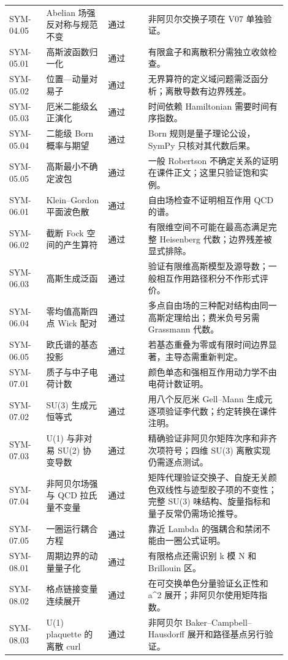 \begin{longtable}{p{0.12\linewidth}p{0.20\linewidth}p{0.13\linewidth}p{0.45\linewidth}}
SYM-04.05 & Abelian 场强反对称与规范不变 & 通过 & 非阿贝尔交换子项在 V07 单独验证。\\
SYM-05.01 & 高斯波函数归一化 & 通过 & 有限盒子和离散积分需独立收敛检查。\\
SYM-05.02 & 位置—动量对易子 & 通过 & 无界算符的定义域问题需泛函分析；离散导数有边界残差。\\
SYM-05.03 & 厄米二能级幺正演化 & 通过 & 时间依赖 Hamiltonian 需要时间有序指数。\\
SYM-05.04 & 二能级 Born 概率与期望 & 通过 & Born 规则是量子理论公设，SymPy 只核对其代数后果。\\
SYM-05.05 & 高斯最小不确定波包 & 通过 & 一般 Robertson 不确定关系的证明在课件正文；这里只验证饱和实例。\\
SYM-06.01 & Klein--Gordon 平面波色散 & 通过 & 自由场检查不证明相互作用 QCD 的谱。\\
SYM-06.02 & 截断 Fock 空间的产生算符 & 通过 & 有限维空间不可能在最高态满足完整 Heisenberg 代数；边界残差被显式排除。\\
SYM-06.03 & 高斯生成泛函 & 通过 & 验证有限维高斯模型及源导数；一般相互作用路径积分不作形式评价。\\
SYM-06.04 & 零均值高斯四点 Wick 配对 & 通过 & 多点自由场的三种配对结构由同一高斯定理给出；费米负号另需 Grassmann 代数。\\
SYM-06.05 & 欧氏谱的基态投影 & 通过 & 若基态重叠为零或有限时间边界显著，主导态需重新判定。\\
SYM-07.01 & 质子与中子电荷计数 & 通过 & 颜色单态和强相互作用动力学不由电荷计数证明。\\
SYM-07.02 & SU(3) 生成元恒等式 & 通过 & 用八个反厄米 Gell--Mann 生成元逐项验证李代数；约定转换在课件注明。\\
SYM-07.03 & U(1) 与非对易 SU(2) 协变导数 & 通过 & 精确验证非阿贝尔矩阵次序和非齐次项符号；四维 SU(3) 离散实现仍需逐点测试。\\
SYM-07.04 & 非阿贝尔场强与 QCD 拉氏量不变量 & 通过 & 矩阵代理验证交换子、自旋无关颜色双线性与迹型胶子项的不变性；完整 SU(3) 味结构、旋量指标和量子反常仍需场论推导。\\
SYM-07.05 & 一圈运行耦合方程 & 通过 & 靠近 Lambda 的强耦合和禁闭不能由一圈公式证明。\\
SYM-08.01 & 周期边界的动量量子化 & 通过 & 有限格点还需识别 k 模 N 和 Brillouin 区。\\
SYM-08.02 & 格点链接变量连续展开 & 通过 & 在可交换单色分量验证幺正性和 a^2 展开；非阿贝尔使用矩阵指数。\\
SYM-08.03 & U(1) plaquette 的离散 curl & 通过 & 非阿贝尔 Baker--Campbell--Hausdorff 展开和路径基点另行验证。\\

\end{longtable}
